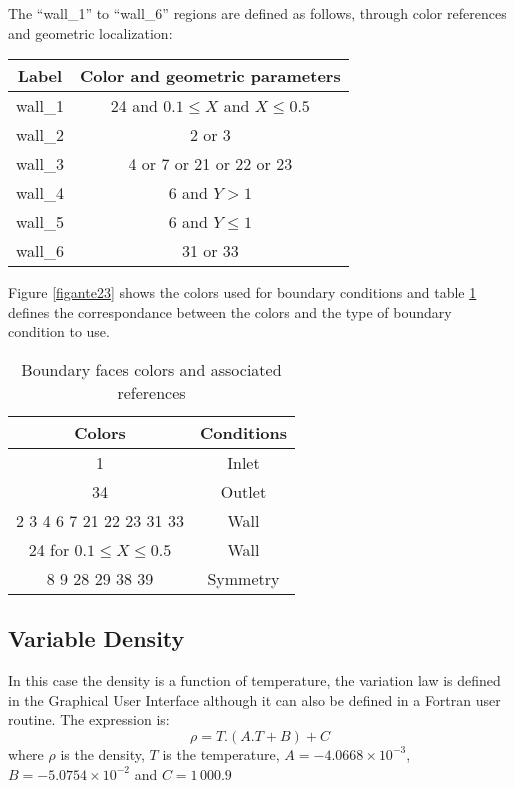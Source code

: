 The ``wall\_1'' to ``wall\_6'' regions are defined as follows, through color
references and geometric localization:
\begin{center}
\begin{tabular}{c|c}
Label & Color and geometric parameters \\
\hline
wall\_1 & 24 and $0.1\leqslant X$ and $X\leqslant 0.5$ \\
wall\_2 & 2 or 3 \\
wall\_3 & 4 or 7 or 21 or 22 or 23 \\
wall\_4 & 6 and $Y>1$ \\
wall\_5 & 6 and $Y\leqslant1$ \\
wall\_6 & 31 or 33 \\
\end{tabular}
\end{center}

Figure \ref{figante23} shows the colors used for boundary conditions and
table \ref{tabante31} defines the correspondance between the colors and
the type of boundary condition to use.

\begin{table}[htp]
\begin{center}
\begin{tabular}{|c|c|}
\hline
Colors & Conditions \\
\hline
1 & Inlet \\
\hline
34 & Outlet \\
\hline
2 3 4 6 7 21 22 23 31 33 & Wall \\
\hline
24 for $0.1 \leq X \leq 0.5$ & Wall \\
\hline
8 9 28 29 38 39 & Symmetry \\
\hline
\end{tabular}
\caption{Boundary faces colors and associated references}
\label{tabante31}
\end{center}
\end{table}

        \subsection{Variable Density}
In this case the density is a function of temperature, the variation law is defined
 in the Graphical User Interface although it can also be defined in a Fortran user 
routine. The expression is:
\begin{equation}
\rho = T.(A.T + B) + C
\end{equation}
where $\rho$ is the density, $T$ is the temperature, $A = -4.0668\times10^{-3}$,
$B =-5.0754\times 10^{-2}$ and $C = 1\,000.9$

